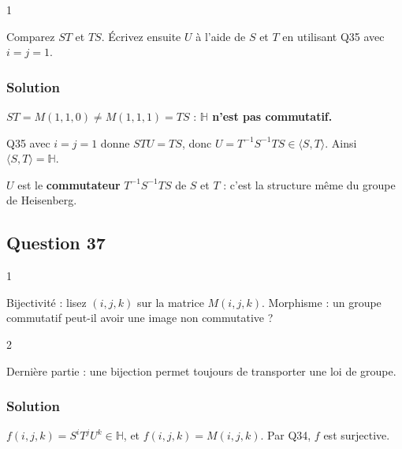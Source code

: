 \documentclass[11pt,a4paper]{article}
\begin{document}
\begin{indication}{1}

Comparez \(ST\) et \(TS\). Écrivez ensuite \(U\) à l'aide de \(S\) et \(T\) en utilisant Q35 avec \(i=j=1\).

\end{indication}

\hypertarget{solution-35}{%
\subsubsection{Solution}\label{solution-35}}

\(ST=M(1,1,0)\neq M(1,1,1)=TS\) : \textbf{\(\mathbb{H}\) n'est pas commutatif.}

Q35 avec \(i=j=1\) donne \(STU=TS\), donc \(U=T^{-1}S^{-1}TS\in\langle S,T\rangle\). Ainsi \(\boxed{\langle S,T\rangle=\mathbb{H}}\).

\begin{methode}

\(U\) est le \textbf{commutateur} \(T^{-1}S^{-1}TS\) de \(S\) et \(T\) : c'est la structure même du groupe de Heisenberg.

\end{methode}

\hypertarget{question-37}{%
\subsection{Question 37}\label{question-37}}

\begin{indication}{1}

Bijectivité : lisez \((i,j,k)\) sur la matrice \(M(i,j,k)\). Morphisme : un groupe commutatif peut-il avoir une image non commutative ?

\end{indication}

\begin{indication}{2}

Dernière partie : une bijection permet toujours de transporter une loi de groupe.

\end{indication}

\hypertarget{solution-36}{%
\subsubsection{Solution}\label{solution-36}}

\(f(i,j,k)=S^iT^jU^k\in\mathbb{H}\), et \(f(i,j,k)=M(i,j,k)\). Par Q34, \(f\) est surjective.
\end{document}
